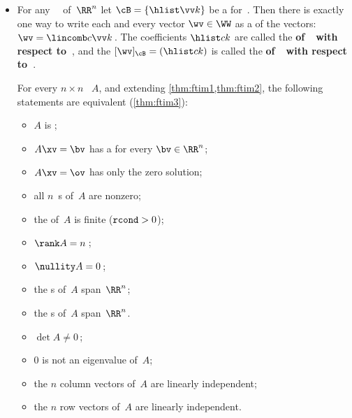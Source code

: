 \begin{itemize}
\itemme \cref{pro:bfe} finds a  for a ~\WW\ specified as the solutions of a system of equations.
\begin{enumerate}
\item Rewrite the system of equations as the  system \(A\xv=\ov\) so that the subspace~\WW\ is the  of \(m\times n\) matrix~\(A\).
\item  Find an \svd\ factorization \(A=\usv\) and let \(r=\rank A\) be the number of nonzero s (or effectively nonzero when the matrix has experimental errors).
\item The last \(n-r\) columns of~\(V\) form an  for the subspace~\WW.
\end{enumerate}

\item For any ~\WW\ of~\(\RR^n\) let \(\cB=\{\hlist\vv k\}\) be a  for~\WW.  
Then there is exactly one way to write each and every vector \(\wv\in\WW\) as a  of the  vectors: \(\wv=\lincomb c\vv k\)\,.
The coefficients \(\hlist ck\) are called the \textbf{ of~\wv\ with respect to~\cB}, and the  \([\wv]_{\cB}=(\hlist ck)\) is called the \textbf{ of~\wv\ with respect to~\cB}.

\itemme For every \(n\times n\) ~\(A\), and  
extending \cref{thm:ftim1,thm:ftim2}, the following statements are equivalent (\cref{thm:ftim3}):
\begin{itemize}
\item \(A\) is ;
\item \(A\xv=\bv\) has a  for every \(\bv\in\RR^n\);
\item \(A\xv=\ov\) has only the zero solution;
\item all \(n\)~s of~\(A\) are nonzero;
\item the  of~\(A\) is finite (\(\verb|rcond|>0\));
\item {}\(\rank A=n\)\,;
\item {}\(\nullity A=0\)\,;
\item the s of~\(A\) span~\(\RR^n\);
\item the s of~\(A\) span~\(\RR^n\).
\item \(\det A\neq 0\)\,;
\item \(0\) is not an eigenvalue of~\(A\);
\item the \(n\) column vectors of~\(A\) are linearly independent;
\item the \(n\) row vectors of~\(A\) are linearly independent.
\end{itemize}








\end{itemize}
